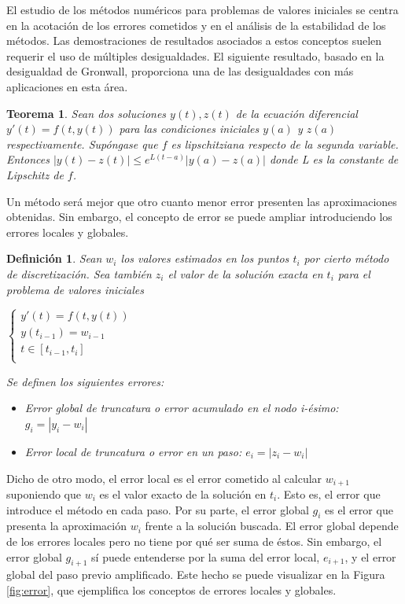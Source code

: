 \documentclass{article}
\theoremstyle{theorem-style}  %
\newtheorem{theorem}{Teorema}[section]  %
\theoremstyle{definition-style}
\newtheorem{definition}{Definición}[section]
\theoremstyle{example-style}
\begin{document}
	El estudio de los métodos numéricos para problemas de valores iniciales se centra en la acotación de los errores cometidos y en el análisis de la estabilidad de los métodos. Las demostraciones de resultados asociados a estos conceptos suelen requerir el uso de múltiples desigualdades. El siguiente resultado, basado en la desigualdad de Gronwall, proporciona una de las desigualdades con más aplicaciones en esta área.

	\begin{theorem} \label{theorem:desigualdad-sols}
		Sean dos soluciones $y(t), z(t)$ de la ecuación diferencial $y'(t) = f(t,y(t))$ para las condiciones iniciales $y(a)$ y $z(a)$ respectivamente. Supóngase que $f$ es lipschitziana respecto de la segunda variable. Entonces $|y(t)-z(t)| \leq e^{L(t-a)}|y(a)-z(a)|$ donde L es la constante de Lipschitz de $f$.
	\end{theorem}

	Un método será mejor que otro cuanto menor error presenten las aproximaciones obtenidas. Sin embargo, el concepto de error se puede ampliar introduciendo los errores locales y globales.

	\begin{definition}
		Sean $w_i$ los valores estimados en los puntos $t_i$ por cierto método de discretización. Sea también $z_i$ el valor de la solución exacta en $t_i$ para el problema de valores iniciales

		\begin{center}
			$\begin{cases}
			y'(t) = f(t,y(t)) \\
			y(t_{i-1}) = w_{i-1} \\
			t \in [t_{i-1},t_{i}] \\
			\end{cases}$
		\end{center}

		Se definen los siguientes errores:

		\begin{itemize}
			\item Error global de truncatura o error acumulado en el nodo i-ésimo: $g_i=|y_i - w_i|$
			\item Error local de truncatura o error en un paso: $e_i = |z_i - w_i|$
		\end{itemize}
	\end{definition}

	Dicho de otro modo, el error local es el error cometido al calcular $w_{i+1}$ suponiendo que $w_i$ es el valor exacto de la solución en $t_i$. Esto es, el error que introduce el método en cada paso. Por su parte, el error global $g_i$ es el error que presenta la aproximación $w_i$ frente a la solución buscada. El error global depende de los errores locales pero no tiene por qué ser suma de éstos. Sin embargo, el error global $g_{i+1}$ sí puede entenderse por la suma del error local, $e_{i+1}$, y el error global del paso previo amplificado. Este hecho se puede visualizar en la Figura \ref{fig:error}, que ejemplifica los conceptos de errores locales y globales.
\end{document}
